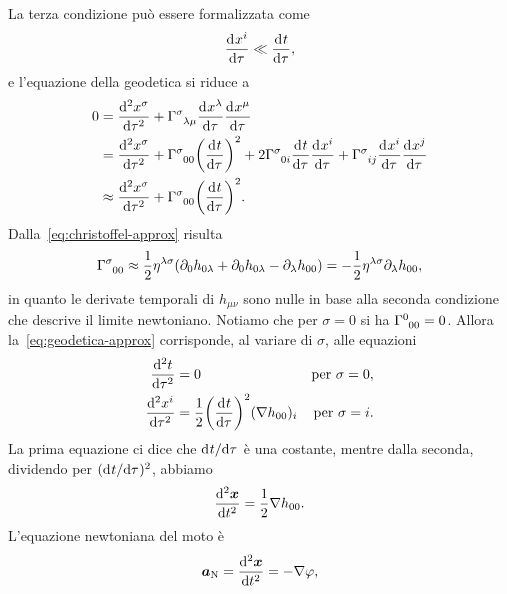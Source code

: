 La terza condizione può essere formalizzata come
\begin{equation}
  \toder{x^{i}}{\tau} \ll \toder{t}{\tau},
\end{equation}
e l'equazione della geodetica si riduce a
\begin{equation}
  \label{eq:geodetica-approx}
  \begin{split}
    0 &= \toder[2]{x^{\sigma}}{\tau} + \tensor{\Gamma}{^{\sigma}_{\lambda\mu}}
    \toder{x^{\lambda}}{\tau} \toder{x^{\mu}}{\tau} \\
    &= \toder[2]{x^{\sigma}}{\tau} + \tensor{\Gamma}{^{\sigma}_{00}} \bigg(
    \toder{t}{\tau} \bigg)^{2} + 2\tensor{\Gamma}{^{\sigma}_{0i}}\toder{t}{\tau}
    \toder{x^{i}}{\tau} + \tensor{\Gamma}{^{\sigma}_{ij}} \toder{x^{i}}{\tau}
    \toder{x^{j}}{\tau} \\
    &\approx \toder[2]{x^{\sigma}}{\tau} + \tensor{\Gamma}{^{\sigma}_{00}}\bigg(
    \toder{t}{\tau} \bigg)^{2}.
  \end{split}
\end{equation}
Dalla~\eqref{eq:christoffel-approx} risulta
\begin{equation}
  \tensor{\Gamma}{^{\sigma}_{00}} \approx
  \frac{1}{2}\eta^{\lambda\sigma}(\partial_{0}h_{0\lambda}
  + \partial_{0}h_{0\lambda} - \partial_{\lambda}h_{00}) =
  -\frac{1}{2}\eta^{\lambda\sigma} \partial_{\lambda}h_{00},
\end{equation}
in quanto le derivate temporali di $h_{\mu\nu}$ sono nulle in base alla seconda
condizione che descrive il limite newtoniano.  Notiamo che per $\sigma=0$ si ha
$\tensor{\Gamma}{^{0}_{00}}=0$.  Allora la~\eqref{eq:geodetica-approx}
corrisponde, al variare di $\sigma$, alle equazioni
\begin{subequations}
  \begin{align}
    \toder[2]{t}{\tau} &= 0 &\text{per $\sigma = 0$}, \\
    \toder[2]{x^{i}}{\tau} &= \frac{1}{2} \bigg( \toder{t}{\tau} \bigg)^{2}
    (\nabla h_{00})_{i} &\text{per $\sigma = i$}.
  \end{align}
\end{subequations}
La prima equazione ci dice che $\ltoder{t}{\tau}$ è una costante, mentre dalla
seconda, dividendo per $(\ltoder{t}{\tau})^{2}$, abbiamo
\begin{equation}
  \toder[2]{\bm{x}}{t} = \frac{1}{2}\nabla h_{00}.
\end{equation}
L'equazione newtoniana del moto è
\begin{equation}
  \bm{a}_{\textup{N}} = \toder[2]{\bm{x}}{t} = -\nabla\phi,
\end{equation}
